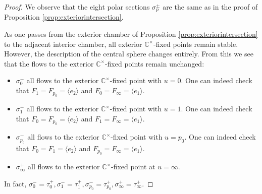 \documentclass[12pt,letterpaper,reqno]{amsart}
\theoremstyle{remark}
\theoremstyle{definition}
\numberwithin{thm}{section}
\numberwithin{equation}{section}
\numberwithin{figure}{section}
\newcommand{\C}{\ensuremath{\mathbb C}}
\begin{document}
\begin{proof} 
We observe that the eight polar sections $\sigma^\pm_p$ are the same as in the proof of Proposition \ref{prop:exteriorintersection}.

As one passes from the exterior chamber of Proposition \ref{prop:exteriorintersection} to the adjacent interior chamber, all exterior $\C^\times$-fixed points remain stable. However, the description of the central sphere changes entirely. From this we see that the flows to the exterior $\C^\times$-fixed points remain unchanged:
 \begin{itemize}
   \item $\sigma_0^-$ all flows to the exterior $\C^\times$-fixed point with $u=0$. One can indeed check that $F_1=F_{p_0}=\langle e_2\rangle$ and $F_0=F_\infty=\langle e_1\rangle$.
    \item$\sigma_1^-$ all flows to the exterior $\C^\times$-fixed point with $u=1$. One can indeed check that $F_0=F_{p_0}=\langle e_2\rangle$ and $F_1=F_\infty=\langle e_1\rangle$.  
        \item $\sigma_{p_0}^-$ all flows to the exterior $\C^\times$-fixed point with $u=p_0$. One can indeed check that $F_0=F_1=\langle e_2\rangle$ and $F_{p_0}=F_\infty=\langle e_1\rangle$. 
        \item $\sigma_{\infty}^+$ all flows to the exterior $\C^\times$-fixed point at $u=\infty$.
        \end{itemize}
In fact, $\sigma_0^- = \tau_0^+, \sigma_1^-=\tau_1^+, \sigma_{p_0}^-=\tau_{p_0}^+, \sigma_\infty^+ =\tau_\infty^+$. 


\end{proof}
\end{document}
